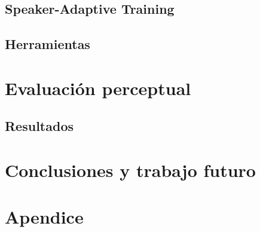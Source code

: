 \documentclass[11pt,a4paper,twoside]{tesis}
\begin{document}
\section{Speaker-Adaptive Training}\label{speakerAdaptativeTraining}


\section{Herramientas} \label{herramientas}

\chapter{Evaluación perceptual}\label{evaluacionPerceptual}


\section{Resultados}


\chapter{Conclusiones y trabajo futuro}


\pagebreak
\chapter{Apendice}


\backmatter
%
\end{document}
